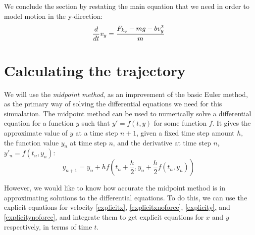 \documentclass[12pt, twoside, a4paper]{article}
\begin{document}
We conclude the section by restating the main equation that we need in order to model motion in the y-direction:
\begin{equation} \label{dex}
\frac{d}{dt} v_y =  \frac{F_{k_y} - mg - bv_y^2}{m} \\
\end{equation}

\section{Calculating the trajectory}
We will use the \emph{midpoint method}, as an improvement of the basic Euler method, as the primary way of solving the differential equations we need for this simualation. The midpoint method can be used to numerically solve a differential equation for a function $y$ such that $y' = f(t, y)$ for some function $f$. It gives the approximate value of $y$ at a time step $n+1$, given a fixed time step amount $h$, the function value $y_n$ at time step $n$, and the derivative at time step $n$, $y'_n = f(t_n, y_n)$:
\begin{equation}
y_{n+1} = y_n + hf\left(t_n+\frac{h}{2},y_n+\frac{h}{2}f(t_n, y_n)\right)
\end{equation}

However, we would like to know how accurate the midpoint method is in approximating solutions to the differential equations. To do this, we can use the explicit equations for velocity \eqref{explicitx}, \eqref{explicitxnoforce}, \eqref{explicity}, and \eqref{explicitynoforce}, and integrate them to get explicit equations for $x$ and $y$ respectively, in terms of time $t$.
\end{document}
